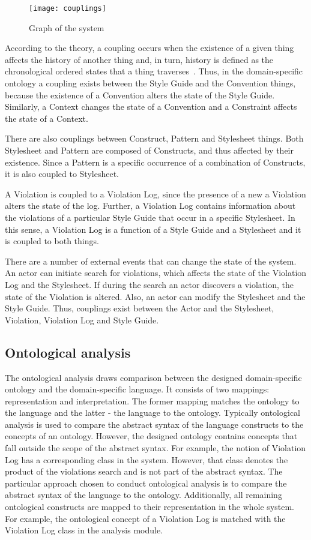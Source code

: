 \begin{figure}[h!]
  \centering
  \caption{Graph of the system}
  \label{fig:couplings}
  \texttt{[image: couplings]}
\end{figure}

According to the theory, a coupling occurs when the existence of a given thing affects the history
of another thing and, in turn, history is defined as the chronological ordered states that a thing
traverses~\cite{wand1990ontological}. Thus, in the domain-specific ontology a coupling exists
between the Style Guide and the Convention things, because the existence of a Convention alters the
state of the Style Guide. Similarly, a Context changes the state of a Convention and a Constraint
affects the state of a Context.

There are also couplings between Construct, Pattern and Stylesheet things. Both Stylesheet and
Pattern are composed of Constructs, and thus affected by their existence. Since a Pattern is a
specific occurrence of a combination of Constructs, it is also coupled to Stylesheet.

A Violation is coupled to a Violation Log, since the presence of a new a Violation alters the state
of the log. Further, a Violation Log contains information about the violations of a particular Style
Guide that occur in a specific Stylesheet. In this sense, a Violation Log is a function of a Style
Guide and a Stylesheet and it is coupled to both things.

There are a number of external events that can change the state of the system. An actor can initiate
search for violations, which affects the state of the Violation Log and the Stylesheet. If during
the search an actor discovers a violation, the state of the Violation is altered. Also, an actor can
modify the Stylesheet and the Style Guide. Thus, couplings exist between the Actor and the
Stylesheet, Violation, Violation Log and Style Guide.

\subsection{Ontological analysis}

The ontological analysis draws comparison between the designed domain-specific ontology and the
domain-specific language. It consists of two mappings: representation and interpretation. The former
mapping matches the ontology to the language and the latter - the language to the ontology.
Typically ontological analysis is used to compare the abstract syntax of the language constructs to
the concepts of an ontology. However, the designed ontology contains concepts that fall outside the
scope of the abstract syntax. For example, the notion of Violation Log has a corresponding class in
the system. However, that class denotes the product of the violations search and is not part of the
abstract syntax. The particular approach chosen to conduct ontological analysis is to compare the
abstract syntax of the language to the ontology. Additionally, all remaining ontological constructs
are mapped to their representation in the whole system. For example, the ontological concept of a
Violation Log is matched with the Violation Log class in the analysis module.

